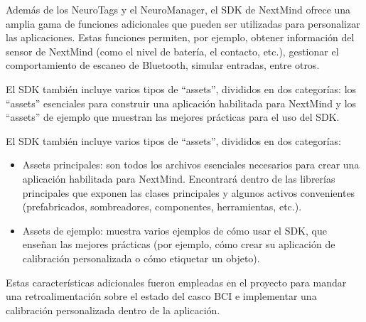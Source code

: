 Además de los NeuroTags y el NeuroManager, el SDK de NextMind ofrece una amplia gama de funciones adicionales que pueden ser utilizadas para personalizar las aplicaciones. Estas funciones permiten, por ejemplo, obtener información del sensor de NextMind (como el nivel de batería, el contacto, etc.), gestionar el comportamiento de escaneo de Bluetooth, simular entradas, entre otros. 



El SDK también incluye varios tipos de ``assets'', divididos en dos categorías: los ``assets'' esenciales para construir una aplicación habilitada para NextMind y los ``assets'' de ejemplo que muestran las mejores prácticas para el uso del SDK.



El SDK también incluye varios tipos de ``assets'', divididos en dos categorías:

\begin{itemize}
    \item Assets principales: son todos los archivos esenciales necesarios para crear una aplicación habilitada para NextMind. Encontrará dentro de las librerías principales que exponen las clases principales y algunos activos convenientes (prefabricados, sombreadores, componentes, herramientas, etc.).
    \item Assets de ejemplo: muestra varios ejemplos de cómo usar el SDK, que enseñan las mejores prácticas (por ejemplo, cómo crear su aplicación de calibración personalizada o cómo etiquetar un objeto).
\end{itemize}

Estas características adicionales fueron empleadas en el proyecto para mandar una retroalimentación sobre el estado del casco BCI e implementar una calibración personalizada dentro de la aplicación.